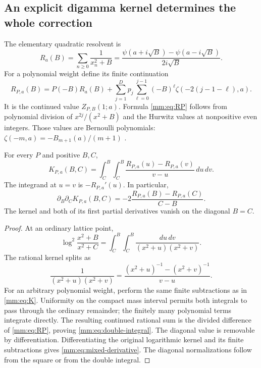 \subsection{An explicit digamma kernel determines the whole correction}

The elementary quadratic resolvent is
\begin{equation}\label{mm:eq:R}
 R_a(B)=\sum_{n\ge0}\frac1{x_n^2+B}
       =\frac{\psi(a+i\sqrt B)-\psi(a-i\sqrt B)}{2i\sqrt B}.
\end{equation}
For a polynomial weight define its finite continuation
\begin{equation}\label{mm:eq:RP}
 R_{P,a}(B)=P(-B)R_a(B)
    +\sum_{j=1}^{D}p_j\sum_{\ell=0}^{j-1}
                      (-B)^\ell\zeta(-2(j-1-\ell),a).
\end{equation}
It is the continued value $Z_{P,B}(1;a)$.  Formula
\eqref{mm:eq:RP} follows from polynomial division of
$x^{2j}/(x^2+B)$ and the Hurwitz values at nonpositive even integers.
Those values are Bernoulli polynomials:
$\zeta(-m,a)=-B_{m+1}(a)/(m+1)$ \cite{DLMFZeta}.

\begin{theorem}
\label{mm:thm:integral}
For every $P$ and positive $B,C$,
\begin{equation}\label{mm:eq:double-integral}
 \boxed{\displaystyle
 K_{P,a}(B,C)=\int_C^B\!\int_C^B
              \frac{R_{P,a}(u)-R_{P,a}(v)}{v-u}\,du\,dv.}
\end{equation}
The integrand at $u=v$ is $-R_{P,a}'(u)$.  In particular,
\begin{equation}\label{mm:eq:mixed-derivative}
 \partial_B\partial_CK_{P,a}(B,C)
       =-2\frac{R_{P,a}(B)-R_{P,a}(C)}{C-B}.
\end{equation}
The kernel and both of its first partial derivatives vanish on the
diagonal $B=C$.
\end{theorem}
\begin{proof}
At an ordinary lattice point,
\[
 \log^2\frac{x^2+B}{x^2+C}
   =\int_C^B\!\int_C^B\frac{du\,dv}{(x^2+u)(x^2+v)}.
\]
The rational kernel splits as
\[
 \frac1{(x^2+u)(x^2+v)}
   =\frac{(x^2+u)^{-1}-(x^2+v)^{-1}}{v-u}.
\]
For an arbitrary polynomial weight, perform the same finite
subtractions as in \eqref{mm:eq:K}.  Uniformity on the compact mass
interval permits both integrals to pass through the ordinary remainder;
the finitely many polynomial terms integrate directly.  The resulting
continued rational sum is the divided difference of
\eqref{mm:eq:RP}, proving \eqref{mm:eq:double-integral}.
The diagonal value is removable by differentiation.  Differentiating
the original logarithmic kernel and its finite subtractions gives
\eqref{mm:eq:mixed-derivative}.  The diagonal normalizations follow
from the square or from the double integral.
\end{proof}


